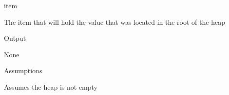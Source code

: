 \documentclass[pdftex, 12pt]{article}
\begin{document}
\begin{description}
\begin{description}
				\begin{description}

					\item{item}

						The item that will hold the value that was located in the root of the heap

				\end{description}

			\item{Output}

				None

			\item{Assumptions}

				Assumes the heap is not empty

		\end{description}
\end{description}
\end{document}
